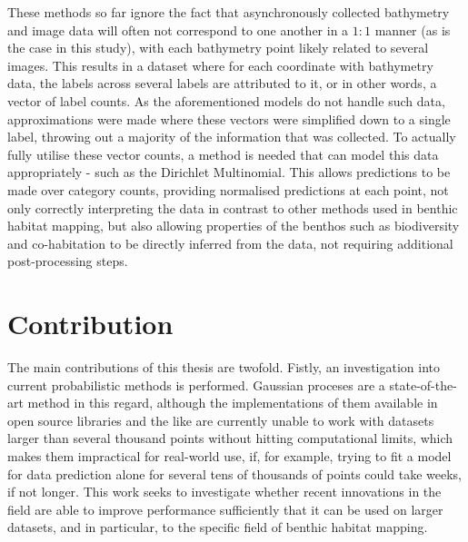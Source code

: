 These methods so far ignore the fact that asynchronously collected bathymetry and image data will often not correspond to one another in a $1:1$ manner (as is the case in this study), with each bathymetry point likely related to several images. This results in a dataset where for each coordinate with bathymetry data, the labels across several labels are attributed to it, or in other words, a vector of label counts. As the aforementioned models do not handle such data, approximations were made where these vectors were simplified down to a single label, throwing out a majority of the information that was collected. To actually fully utilise these vector counts, a method is needed that can model this data appropriately - such as the Dirichlet Multinomial. This allows predictions to be made over category counts, providing normalised predictions at each point, not only correctly interpreting the data in contrast to other methods used in benthic habitat mapping, but also allowing properties of the benthos such as biodiversity and co-habitation to be directly inferred from the data, not requiring additional post-processing steps.


\section{Contribution}

The main contributions of this thesis are twofold. Fistly, an investigation into current probabilistic methods is performed. Gaussian proceses are a state-of-the-art method in this regard, although the implementations of them available in open source libraries and the like are currently unable to work with datasets larger than several thousand points without hitting computational limits, which makes them impractical for real-world use, if, for example, trying to fit a model for data prediction alone for several tens of thousands of points could take weeks, if not longer. This work seeks to investigate whether recent innovations in the field are able to improve performance sufficiently that it can be used on larger datasets, and in particular, to the specific field of benthic habitat mapping.

